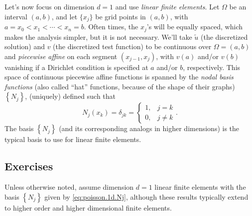 Let's now focus on dimension $d = 1$ and use \emph{linear finite elements}. Let $\Omega$ be an interval $(a,b)$, and let $\{x_j\}$ be grid points in $(a,b)$, with $a = x_0 < x_1 < \dotsm < x_n = b$. Often times, the $x_j$'s will be equally spaced, which makes the analysis simpler, but it is not necessary. We'll take $\tilde{u}$ (the discretized solution) and $v$ (the discretized test function) to be continuous over $\Omega = (a,b)$ and \emph{piecewise affine} on each segment $\left( x_{j-1}, x_j \right)$, with $v(a)$ and/or $v(b)$ vanishing if a Dirichlet condition is specified at $a$ and/or $b$, respectively. This space of continuous piecewise affine functions is spanned by the \emph{nodal basis functions} (also called ``hat'' functions, because of the shape of their graphs) $\left\{ N_j \right\}$, (uniquely) defined such that
\begin{equation}\label{eq:poisson.1d.Nj}
N_j(x_k) = \delta_{jk} = \begin{cases} 1, & j = k \\ 0, & j \neq k \end{cases}.
\end{equation}
The basis $\left\{ N_j \right\}$ (and its corresponding analogs in higher dimensions) is the typical basis to use for linear finite elements.

\subsection{Exercises}

Unless otherwise noted, assume dimension $d = 1$ linear finite elements with the basis $\left\{ N_j \right\}$ given by \eqref{eq:poisson.1d.Nj}, although these results typically extend to higher order and higher dimensional finite elements.

